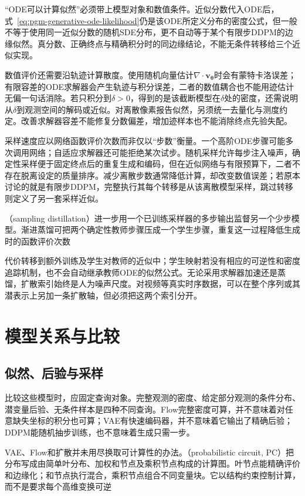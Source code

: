 “ODE可以计算似然”必须带上模型对象和数值条件。近似分数代入ODE后，式~\eqref{eq:pgm-generative-ode-likelihood}仍是该ODE所定义分布的密度公式，但一般不等于使用同一近似分数的随机SDE分布，更不自动等于某个有限步DDPM的边缘似然。真分数、正确终点与精确积分时的同边缘结论，不能无条件转移给三个近似实现。

数值评价还需要沿轨迹计算散度。使用随机向量估计$\nabla\cdot\bm{v}_{\bm{\theta}}$时会有蒙特卡洛误差；有限容差的ODE求解器会产生轨迹与积分误差，二者的数值耦合也不能用迹估计无偏一句话消除。若只积分到$\delta>0$，得到的是该截断模型在$\delta$处的密度，还需说明从$\delta$到观测空间的解码或近似。对离散像素报告似然，另须统一去量化与测度约定。改善求解器容差不能修复分数偏差，增加迹样本也不能消除终点先验失配。

采样速度应以网络函数评价次数而非仅以“步数”衡量。一个高阶ODE步骤可能多次调用网络；自适应求解器还可能拒绝某次试步。随机采样允许每步注入噪声，确定性采样便于固定终点后的重复生成和编码，但在近似网络与有限预算下，二者不存在脱离设定的质量排序。减少离散步数通常降低计算，却改变数值误差；若原本讨论的就是有限步DDPM，完整执行其每个转移是从该离散模型采样，跳过转移则定义了另一套采样近似。

（sampling distillation）进一步用一个已训练采样器的多步输出监督另一个少步模型。渐进蒸馏可把两个确定性教师步骤压成一个学生步骤，重复这一过程降低生成时的函数评价次数

代价转移到额外训练及学生对教师的近似中；学生映射若没有相应的可逆性和密度追踪机制，也不会自动继承教师ODE的似然公式。无论采用求解器加速还是蒸馏，扩散索引始终是人为噪声尺度。对视频等真实时序数据，可以在整个序列或其潜表示上另加一条扩散轴，但必须把这两个索引分开。

\section{模型关系与比较}
\label{sec:pgm-generative-comparison}

\subsection{似然、后验与采样}
\label{sec:pgm-generative-likelihood-posterior-sampling}

比较这些模型时，应固定查询对象。完整观测的密度、给定部分观测的条件分布、潜变量后验、无条件样本是四种不同查询。Flow完整密度可算，并不意味着对任意缺失坐标的积分也可算；VAE有快速编码器，并不意味着它输出了精确后验；DDPM能随机抽步训练，也不意味着生成只需一步。

VAE、Flow和扩散并未用尽换取可计算性的办法。（probabilistic circuit, PC）把分布写成由简单叶分布、加权和节点及乘积节点构成的计算图。叶节点能精确评价和边缘化；和节点执行混合，乘积节点组合不同变量块。它以结构约束控制计算，而不是要求每个高维变换可逆

